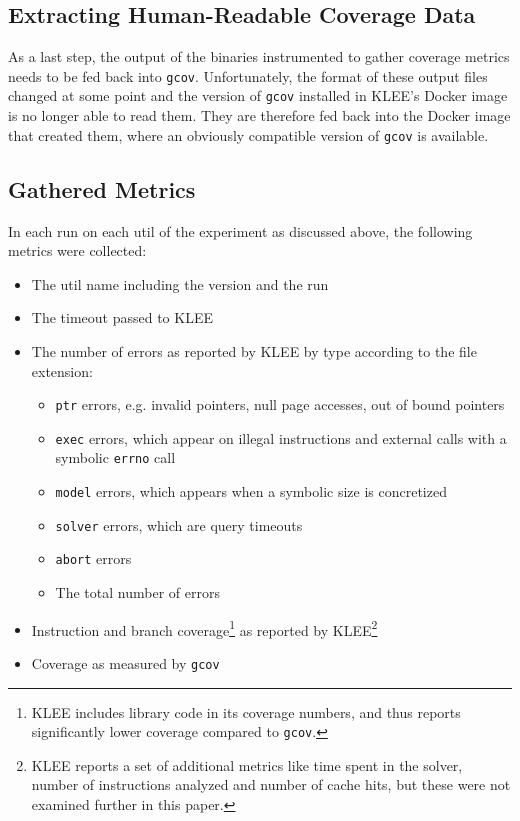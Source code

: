 \documentclass{article}
\begin{document}
\subsection{Extracting Human-Readable Coverage Data}

As a last step, the output of the binaries instrumented to gather coverage metrics needs to be fed back into \lstinline{gcov}. Unfortunately, the format of these output files changed at some point and the version of \lstinline{gcov} installed in KLEE's Docker image is no longer able to read them. They are therefore fed back into the Docker image that created them, where an obviously compatible version of \lstinline{gcov} is available.

\subsection{Gathered Metrics}

In each run on each util of the experiment as discussed above, the following metrics were collected:

\begin{itemize}
    \item The util name including the version and the run
    \item The timeout passed to KLEE
    \item The number of errors as reported by KLEE by type according to the file extension:
          \begin{itemize}
              \item \lstinline{ptr} errors, e.g. invalid pointers, null page accesses, out of bound pointers
              \item \lstinline{exec} errors, which appear on illegal instructions and external calls with a symbolic \lstinline{errno} call
              \item \lstinline{model} errors, which appears when a symbolic size is concretized
              \item \lstinline{solver} errors, which are query timeouts
              \item \lstinline{abort} errors
              \item The total number of errors
          \end{itemize}
    \item Instruction and branch coverage\footnote{KLEE includes library code in its coverage numbers, and thus reports significantly lower coverage compared to \lstinline{gcov}.} as reported by KLEE\footnote{KLEE reports a set of additional metrics like time spent in the solver, number of instructions analyzed and number of cache hits, but these were not examined further in this paper.}
    \item Coverage as measured by \lstinline{gcov}
\end{itemize}
\end{document}
